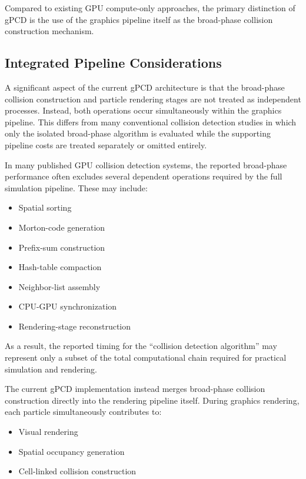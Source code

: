 \documentclass{article}
\begin{document}
Compared to existing GPU compute-only approaches, the primary distinction of gPCD is the use of the graphics pipeline itself as the broad-phase collision construction mechanism.

\subsection{Integrated Pipeline Considerations}

A significant aspect of the current gPCD architecture is that the broad-phase collision construction and particle rendering stages are not treated as independent processes. Instead, both operations occur simultaneously within the graphics pipeline. This differs from many conventional collision detection studies in which only the isolated broad-phase algorithm is evaluated while the supporting pipeline costs are treated separately or omitted entirely.

In many published GPU collision detection systems, the reported broad-phase performance often excludes several dependent operations required by the full simulation pipeline. These may include:

\begin{itemize}
    \item Spatial sorting
    \item Morton-code generation
    \item Prefix-sum construction
    \item Hash-table compaction
    \item Neighbor-list assembly
    \item CPU-GPU synchronization
    \item Rendering-stage reconstruction
\end{itemize}

As a result, the reported timing for the ``collision detection algorithm'' may represent only a subset of the total computational chain required for practical simulation and rendering.

The current gPCD implementation instead merges broad-phase collision construction directly into the rendering pipeline itself. During graphics rendering, each particle simultaneously contributes to:

\begin{itemize}
    \item Visual rendering
    \item Spatial occupancy generation
    \item Cell-linked collision construction
\end{itemize}
\end{document}
